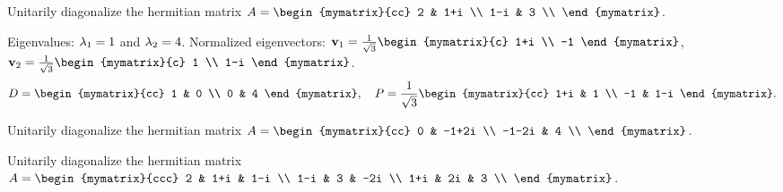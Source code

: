 \begin{ex}
  Unitarily diagonalize the hermitian matrix
  $A=\begin{mymatrix}{cc}
    2  & 1+i \\
    1-i & 3 \\
  \end{mymatrix}$.
  \begin{sol}
    Eigenvalues: $\lambda_1=1$ and $\lambda_2=4$. Normalized
    eigenvectors:
    $\vect{v}_1 = \frac{1}{\sqrt{3}}\begin{mymatrix}{c} 1+i \\ -1 \end{mymatrix}$,
    $\vect{v}_2 = \frac{1}{\sqrt{3}}\begin{mymatrix}{c} 1 \\ 1-i \end{mymatrix}$.
    \begin{equation*}
      D = \begin{mymatrix}{cc} 1 & 0 \\ 0 & 4 \end{mymatrix}, \quad
      P = \frac{1}{\sqrt{3}}\begin{mymatrix}{cc} 1+i & 1 \\ -1 & 1-i \end{mymatrix}.
    \end{equation*}
  \end{sol}
\end{ex}

\begin{ex}
  Unitarily diagonalize the hermitian matrix
  $A=\begin{mymatrix}{cc}
    0  & -1+2i \\
    -1-2i & 4 \\
  \end{mymatrix}$.
\end{ex}

\begin{ex}
  Unitarily diagonalize the hermitian matrix
  $A=\begin{mymatrix}{ccc}
    2   & 1+i & 1-i  \\
    1-i & 3   & -2i  \\
    1+i & 2i  &   3  \\
  \end{mymatrix}$.
\end{ex}
